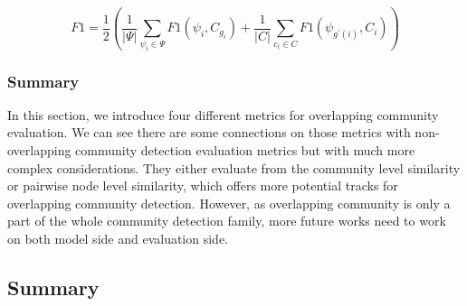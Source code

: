 $$F1 = \frac{1}{2} (\frac{1}{|\Psi|}\sum_{\psi_{i} \in \Psi}F1(\psi_{i},C_{g_{i}})+\frac{1}{|C|}\sum_{c_{i} \in C}F1(\psi_{g^{\prime}(i)},C_{i}))$$


\subsubsection{Summary}

In this section, we introduce four different metrics for overlapping community evaluation. We can see there are some connections on those metrics with non-overlapping community detection evaluation metrics but with much more complex considerations. They either evaluate from the community level similarity or pairwise node level similarity, which offers more potential tracks for overlapping community detection. However, as overlapping community is only a part of the whole community detection family, more future works need to work on both model side and evaluation side.
\subsection{Summary}
